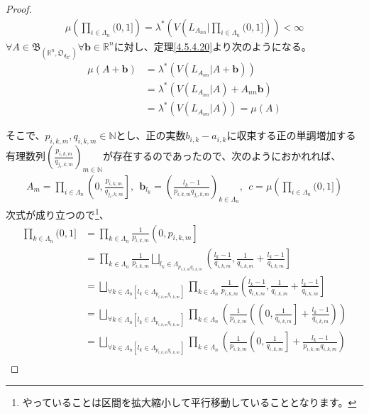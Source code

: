 \documentclass[dvipdfmx]{jsarticle}
\begin{document}
\begin{proof}
\begin{align*}
\mu\left( \prod_{i \in \varLambda_{n}} (0,1] \right) = \lambda^{*}\left( V\left( L_{A_{nn}}|\prod_{i \in \varLambda_{n}} (0,1] \right) \right) < \infty
\end{align*}
$\forall A \in \mathfrak{B}_{\left( \mathbb{R}^{n},\mathfrak{O}_{d_{E^{n}}} \right)}\forall\mathbf{b} \in \mathbb{R}^{n}$に対し、定理\ref{4.5.4.20}より次のようになる。
\begin{align*}
\mu\left( A + \mathbf{b} \right) &= \lambda^{*}\left( V\left( L_{A_{nn}}|A + \mathbf{b} \right) \right)\\
&= \lambda^{*}\left( V\left( L_{A_{nn}}|A \right) + A_{nn}\mathbf{b} \right)\\
&= \lambda^{*}\left( V\left( L_{A_{nn}}|A \right) \right) = \mu(A)
\end{align*}\par
そこで、$p_{i,k,m},q_{i,k,m} \in \mathbb{N}$とし、正の実数$b_{i,k} - a_{i,k}$に収束する正の単調増加する有理数列$\left( \frac{p_{i,k,m}}{q_{j_{i},k,m}} \right)_{m \in \mathbb{N}}$が存在するのであったので、次のようにおかれれば、
\begin{align*}
A_{m} = \prod_{i \in \varLambda_{n}} \left( 0,\frac{p_{i,k,m}}{q_{j_{i},k,m}} \right],\ \ \mathbf{b}_{l_{k}} = \left( \frac{l_{k} - 1}{p_{i,k,m}q_{j_{i},k,m}} \right)_{k \in \varLambda_{n}},\ \ c = \mu\left( \prod_{i \in \varLambda_{n}} (0,1] \right)
\end{align*}
次式が成り立つので\footnote{やっていることは区間を拡大縮小して平行移動していることとなります。}、
\begin{align*}
\prod_{k \in \varLambda_{n}} (0,1] &= \prod_{k \in \varLambda_{n}} {\frac{1}{p_{i,k,m}}\left( 0,p_{i,k,m} \right]}\\
&= \prod_{k \in \varLambda_{n}} {\frac{1}{p_{i,k,m}}\bigsqcup_{l_{k} \in \varLambda_{p_{i,k,m}q_{i,k,m}}} \left( \frac{l_{k} - 1}{q_{i,k,m}},\frac{1}{q_{i,k,m}} + \frac{l_{k} - 1}{q_{i,k,m}} \right]}\\
&= \bigsqcup_{\forall k \in \varLambda_{n}\left[ l_{k} \in \varLambda_{p_{i,k,m}q_{i,k,m}} \right]} {\prod_{k \in \varLambda_{n}} {\frac{1}{p_{i,k,m}}\left( \frac{l_{k} - 1}{q_{i,k,m}},\frac{1}{q_{i,k,m}} + \frac{l_{k} - 1}{q_{i,k,m}} \right]}}\\
&= \bigsqcup_{\forall k \in \varLambda_{n}\left[ l_{k} \in \varLambda_{p_{i,k,m}q_{i,k,m}} \right]} {\prod_{k \in \varLambda_{n}} \left( \frac{1}{p_{i,k,m}}\left( \left( 0,\frac{1}{q_{i,k,m}} \right] + \frac{l_{k} - 1}{q_{i,k,m}} \right) \right)}\\
&= \bigsqcup_{\forall k \in \varLambda_{n}\left[ l_{k} \in \varLambda_{p_{i,k,m}q_{i,k,m}} \right]} {\prod_{k \in \varLambda_{n}} \left( \frac{1}{p_{i,k,m}}\left( 0,\frac{1}{q_{i,k,m}} \right] + \frac{l_{k} - 1}{p_{i,k,m}q_{i,k,m}} \right)}\\

\end{align*}
\end{proof}
\end{document}
